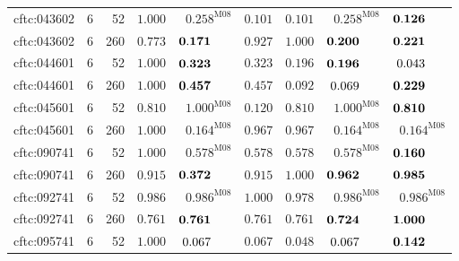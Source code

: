 \documentclass[10pt,a4paper]{article}
\begin{document}
\begin{longtable}{@{}lrrrrrrrr@{}}
cftc:043602 & 6 & 52 & $\mathbf{1.000}$ & $\mathbf{0.258}^{\mathrm{M08}}$ & $\mathbf{0.101}$ & $\mathbf{0.101}$ & $\mathbf{0.258}^{\mathrm{M08}}$ & $\mathbf{0.126}\hphantom{^{\mathrm{M00}}}$ \\
cftc:043602 & 6 & 260 & $\mathbf{0.773}$ & $\mathbf{0.171}\hphantom{^{\mathrm{M00}}}$ & $\mathbf{0.927}$ & $\mathbf{1.000}$ & $\mathbf{0.200}\hphantom{^{\mathrm{M00}}}$ & $\mathbf{0.221}\hphantom{^{\mathrm{M00}}}$ \\
cftc:044601 & 6 & 52 & $\mathbf{1.000}$ & $\mathbf{0.323}\hphantom{^{\mathrm{M00}}}$ & $\mathbf{0.323}$ & $\mathbf{0.196}$ & $\mathbf{0.196}\hphantom{^{\mathrm{M00}}}$ & $0.043\hphantom{^{\mathrm{M00}}}$ \\
cftc:044601 & 6 & 260 & $\mathbf{1.000}$ & $\mathbf{0.457}\hphantom{^{\mathrm{M00}}}$ & $\mathbf{0.457}$ & $0.092$ & $0.069\hphantom{^{\mathrm{M00}}}$ & $\mathbf{0.229}\hphantom{^{\mathrm{M00}}}$ \\
cftc:045601 & 6 & 52 & $\mathbf{0.810}$ & $\mathbf{1.000}^{\mathrm{M08}}$ & $\mathbf{0.120}$ & $\mathbf{0.810}$ & $\mathbf{1.000}^{\mathrm{M08}}$ & $\mathbf{0.810}\hphantom{^{\mathrm{M00}}}$ \\
cftc:045601 & 6 & 260 & $\mathbf{1.000}$ & $\mathbf{0.164}^{\mathrm{M08}}$ & $\mathbf{0.967}$ & $\mathbf{0.967}$ & $\mathbf{0.164}^{\mathrm{M08}}$ & $\mathbf{0.164}^{\mathrm{M08}}$ \\
cftc:090741 & 6 & 52 & $\mathbf{1.000}$ & $\mathbf{0.578}^{\mathrm{M08}}$ & $\mathbf{0.578}$ & $\mathbf{0.578}$ & $\mathbf{0.578}^{\mathrm{M08}}$ & $\mathbf{0.160}\hphantom{^{\mathrm{M00}}}$ \\
cftc:090741 & 6 & 260 & $\mathbf{0.915}$ & $\mathbf{0.372}\hphantom{^{\mathrm{M00}}}$ & $\mathbf{0.915}$ & $\mathbf{1.000}$ & $\mathbf{0.962}\hphantom{^{\mathrm{M00}}}$ & $\mathbf{0.985}\hphantom{^{\mathrm{M00}}}$ \\
cftc:092741 & 6 & 52 & $\mathbf{0.986}$ & $\mathbf{0.986}^{\mathrm{M08}}$ & $\mathbf{1.000}$ & $\mathbf{0.978}$ & $\mathbf{0.986}^{\mathrm{M08}}$ & $\mathbf{0.986}^{\mathrm{M08}}$ \\
cftc:092741 & 6 & 260 & $\mathbf{0.761}$ & $\mathbf{0.761}\hphantom{^{\mathrm{M00}}}$ & $\mathbf{0.761}$ & $\mathbf{0.761}$ & $\mathbf{0.724}\hphantom{^{\mathrm{M00}}}$ & $\mathbf{1.000}\hphantom{^{\mathrm{M00}}}$ \\
cftc:095741 & 6 & 52 & $\mathbf{1.000}$ & $0.067\hphantom{^{\mathrm{M00}}}$ & $0.067$ & $0.048$ & $0.067\hphantom{^{\mathrm{M00}}}$ & $\mathbf{0.142}\hphantom{^{\mathrm{M00}}}$ \\

\end{longtable}
\end{document}
